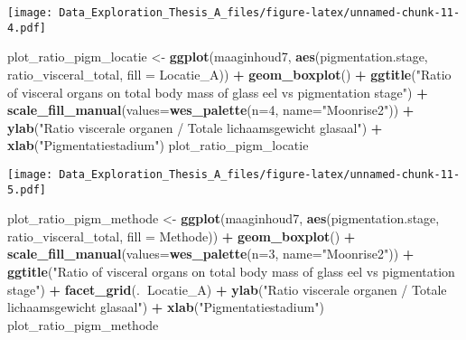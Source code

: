 \documentclass[]{article}
\newenvironment{Shaded}{\begin{snugshade}}{\end{snugshade}}
\newcommand{\KeywordTok}[1]{\textcolor[rgb]{0.13,0.29,0.53}{\textbf{#1}}}
\newcommand{\DataTypeTok}[1]{\textcolor[rgb]{0.13,0.29,0.53}{#1}}
\newcommand{\DecValTok}[1]{\textcolor[rgb]{0.00,0.00,0.81}{#1}}
\newcommand{\StringTok}[1]{\textcolor[rgb]{0.31,0.60,0.02}{#1}}
\newcommand{\OperatorTok}[1]{\textcolor[rgb]{0.81,0.36,0.00}{\textbf{#1}}}
\newcommand{\NormalTok}[1]{#1}
\begin{document}
\texttt{[image: Data\_Exploration\_Thesis\_A\_files/figure-latex/unnamed-chunk-11-4.pdf]}

\begin{Shaded}
\begin{Highlighting}[]
\NormalTok{plot_ratio_pigm_locatie <-}\StringTok{ }\KeywordTok{ggplot}\NormalTok{(maaginhoud7, }\KeywordTok{aes}\NormalTok{(pigmentation.stage, ratio_visceral_total, }\DataTypeTok{fill =}\NormalTok{ Locatie_A)) }\OperatorTok{+}
\StringTok{  }\KeywordTok{geom_boxplot}\NormalTok{() }\OperatorTok{+}
\StringTok{  }\KeywordTok{ggtitle}\NormalTok{(}\StringTok{"Ratio of visceral organs on total body mass of glass eel vs pigmentation stage"}\NormalTok{) }\OperatorTok{+}
\StringTok{  }\KeywordTok{scale_fill_manual}\NormalTok{(}\DataTypeTok{values=}\KeywordTok{wes_palette}\NormalTok{(}\DataTypeTok{n=}\DecValTok{4}\NormalTok{, }\DataTypeTok{name=}\StringTok{"Moonrise2"}\NormalTok{)) }\OperatorTok{+}\StringTok{ }
\StringTok{  }\KeywordTok{ylab}\NormalTok{(}\StringTok{"Ratio viscerale organen / Totale lichaamsgewicht glasaal"}\NormalTok{) }\OperatorTok{+}
\StringTok{  }\KeywordTok{xlab}\NormalTok{(}\StringTok{"Pigmentatiestadium"}\NormalTok{)}
\NormalTok{plot_ratio_pigm_locatie}
\end{Highlighting}
\end{Shaded}

\texttt{[image: Data\_Exploration\_Thesis\_A\_files/figure-latex/unnamed-chunk-11-5.pdf]}

\begin{Shaded}
\begin{Highlighting}[]
\NormalTok{plot_ratio_pigm_methode <-}\StringTok{ }\KeywordTok{ggplot}\NormalTok{(maaginhoud7, }\KeywordTok{aes}\NormalTok{(pigmentation.stage, ratio_visceral_total, }\DataTypeTok{fill =}\NormalTok{ Methode)) }\OperatorTok{+}
\StringTok{  }\KeywordTok{geom_boxplot}\NormalTok{() }\OperatorTok{+}
\StringTok{  }\KeywordTok{scale_fill_manual}\NormalTok{(}\DataTypeTok{values=}\KeywordTok{wes_palette}\NormalTok{(}\DataTypeTok{n=}\DecValTok{3}\NormalTok{, }\DataTypeTok{name=}\StringTok{"Moonrise2"}\NormalTok{)) }\OperatorTok{+}\StringTok{ }
\StringTok{  }\KeywordTok{ggtitle}\NormalTok{(}\StringTok{"Ratio of visceral organs on total body mass of glass eel vs pigmentation stage"}\NormalTok{) }\OperatorTok{+}
\StringTok{  }\KeywordTok{facet_grid}\NormalTok{(.}\OperatorTok{~}\NormalTok{Locatie_A) }\OperatorTok{+}
\StringTok{  }\KeywordTok{ylab}\NormalTok{(}\StringTok{"Ratio viscerale organen / Totale lichaamsgewicht glasaal"}\NormalTok{) }\OperatorTok{+}
\StringTok{  }\KeywordTok{xlab}\NormalTok{(}\StringTok{"Pigmentatiestadium"}\NormalTok{)}
\NormalTok{plot_ratio_pigm_methode}
\end{Highlighting}
\end{Shaded}
\end{document}
